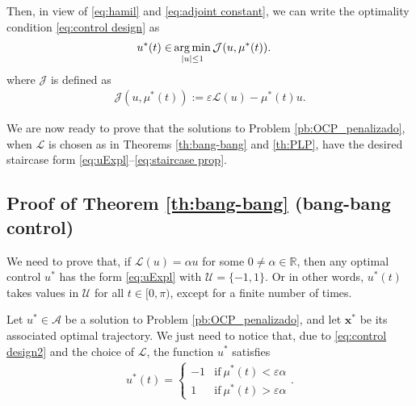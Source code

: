 \documentclass[9pt,shortpaper,twoside,web]{ieeecolor}
\begin{document}
Then, in view of \eqref{eq:hamil} and \eqref{eq:adjoint constant}, we can write the optimality condition \eqref{eq:control design} as
\begin{align}\label{eq:control design2}
	u^\ast(t)  \in & \operatorname*{arg\,min}_{|u|\leq 1}  \mathcal{J} (u,\mu^\ast(t)).  
\end{align}    
where $\mathcal{J}$ is defined as
\begin{align}\label{eq:functionalJ}
	\mathcal{J} (u,\mu^\ast(t)):= \varepsilon \mathcal{L}(u) - \mu^\ast(t) u .
\end{align}    

We are now ready to prove that the solutions to Problem \ref{pb:OCP_penalizado},  when $\mathcal{L}$ is chosen as in Theorems \ref{th:bang-bang} and \ref{th:PLP}, have the desired staircase form \eqref{eq:uExpl}--\eqref{eq:staircase prop}.

\subsection{Proof of Theorem \ref{th:bang-bang} (bang-bang control)}\label{sec: proof:bang-bang}

We need to prove that, if $\mathcal{L}(u) = \alpha u$ for some $0 \neq \alpha\in \mathbb{R}$, then any optimal control $u^\ast$ has the form \eqref{eq:uExpl} with $\mathcal{U}=\{-1,1\}$. Or in other words,  $u^\ast(t)$ takes values in $\mathcal{U}$ for all $t\in [0,\pi)$, except for a finite number of times.

Let $u^\ast\in \mathcal{A}$ be a solution to Problem \ref{pb:OCP_penalizado}, and let $\bm{x}^\ast$ be its associated optimal trajectory. We just need to notice that, due to \eqref{eq:control design2} and the choice of $\mathcal{L}$, the function $u^\ast$  satisfies
\begin{align*}
	u^\ast (t) = \begin{cases}
		-1 & \text{if} \   \mu^\ast(t) < \varepsilon\alpha 
		\\
		1 & \text{if} \  \mu^\ast(t) > \varepsilon\alpha
	\end{cases}.
\end{align*}
\end{document}
